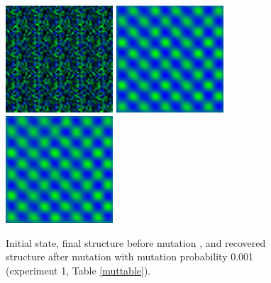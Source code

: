 \begin{figure}
\begin{center}
\includegraphics[width=4cm, height=4cm]{st1.png}
\includegraphics[width=4cm, height=4cm]{bm1.png}
\includegraphics[width=4cm, height=4cm]{am1.png}
\end{center}
\caption{Initial state, final structure before mutation , and recovered structure after mutation with mutation probability 0.001 (experiment 1, Table \ref{muttable}).}
\label{mut1}
\end{figure}

